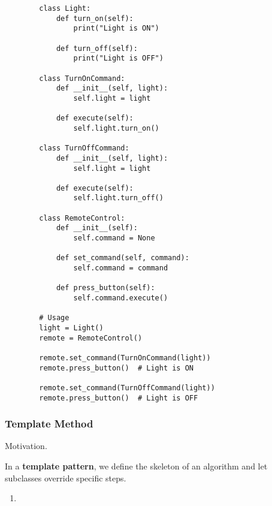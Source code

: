    \begin{example}
      \begin{lstlisting}
        class Light:
            def turn_on(self):
                print("Light is ON")
            
            def turn_off(self):
                print("Light is OFF")

        class TurnOnCommand:
            def __init__(self, light):
                self.light = light
            
            def execute(self):
                self.light.turn_on()

        class TurnOffCommand:
            def __init__(self, light):
                self.light = light
            
            def execute(self):
                self.light.turn_off()

        class RemoteControl:
            def __init__(self):
                self.command = None
            
            def set_command(self, command):
                self.command = command
            
            def press_button(self):
                self.command.execute()

        # Usage
        light = Light()
        remote = RemoteControl()

        remote.set_command(TurnOnCommand(light))
        remote.press_button()  # Light is ON

        remote.set_command(TurnOffCommand(light))
        remote.press_button()  # Light is OFF 
      \end{lstlisting}
    \end{example}

  \subsubsection{Template Method}

    Motivation. 

    \begin{definition}
      In a \textbf{template pattern}, we define the skeleton of an algorithm and let subclasses override specific steps. 
      \begin{enumerate}
        \item 
      \end{enumerate}
    \end{definition}

